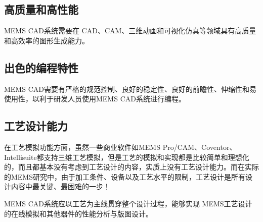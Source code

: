 \documentclass[no-math]{YangThesis}
\begin{document}
\subsection{高质量和高性能}

MEMS CAD系统需要在 CAD、CAM、三维动画和可视化仿真等领域具有高质量和高效率的图形生成能力。

\subsection{出色的编程特性}

MEMS CAD需要有严格的规范控制、良好的稳定性、良好的前瞻性、伸缩性和易使用性，以利于研发人员使用MEMS CAD系统进行编程。

\subsection{工艺设计能力}

在工艺模拟功能方面，虽然一些商业软件如MEMS Pro/CAM、Coventor、Intellisuite都支持三维工艺模拟\cite{bibc62}，但是工艺的模拟和实现都是比较简单和理想化的，而且都基本没有考虑到工艺设计的内容，实质上没有工艺设计能力。而在实际的MEMS研究中，由于加工条件、设备以及工艺水平的限制，工艺设计是所有设计内容中最关键、最困难的一步！

MEMS CAD系统应以工艺为主线贯穿整个设计过程，能够实现 MEMS工艺设计的在线模拟和其他器件的性能分析与版图设计。
\end{document}
